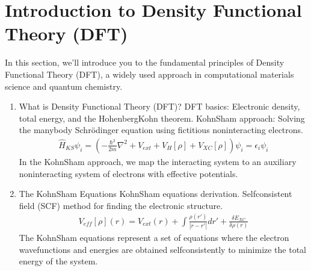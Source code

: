 \documentclass[letterpaper,10pt,english]{sphinxmanual}
\begin{document}
\section{Introduction to Density Functional Theory (DFT)}
\label{\detokenize{dft/dft:introduction-to-density-functional-theory-dft}}
\sphinxAtStartPar
In this section, we’ll introduce you to the fundamental principles of Density Functional Theory (DFT), a widely used approach in computational materials science and quantum chemistry.
\begin{enumerate}
%
\item {} 
\sphinxAtStartPar
What is Density Functional Theory (DFT)?
\sphinxhyphen{} DFT basics: Electronic density, total energy, and the Hohenberg\sphinxhyphen{}Kohn theorem.
\sphinxhyphen{} Kohn\sphinxhyphen{}Sham approach: Solving the many\sphinxhyphen{}body Schrödinger equation using fictitious non\sphinxhyphen{}interacting electrons.
\begin{equation*}
\begin{split}\hat{H}_{KS}\psi_i = \left(-\frac{\hbar^2}{2m}\nabla^2 + V_{ext} + V_{H}[\rho] + V_{XC}[\rho]\right)\psi_i = \epsilon_i\psi_i\end{split}
\end{equation*}
\sphinxAtStartPar
In the Kohn\sphinxhyphen{}Sham approach, we map the interacting system to an auxiliary non\sphinxhyphen{}interacting system of electrons with effective potentials.

\item {} 
\sphinxAtStartPar
The Kohn\sphinxhyphen{}Sham Equations
\sphinxhyphen{} Kohn\sphinxhyphen{}Sham equations derivation.
\sphinxhyphen{} Self\sphinxhyphen{}consistent field (SCF) method for finding the electronic structure.
\begin{equation*}
\begin{split}V_{eff}[\rho](r) = V_{ext}(r) + \int\frac{\rho(r')}{|r - r'|}dr' + \frac{\delta E_{XC}}{\delta\rho(r)}\end{split}
\end{equation*}
\sphinxAtStartPar
The Kohn\sphinxhyphen{}Sham equations represent a set of equations where the electron wavefunctions and energies are obtained self\sphinxhyphen{}consistently to minimize the total energy of the system.

\end{enumerate}
\end{document}
